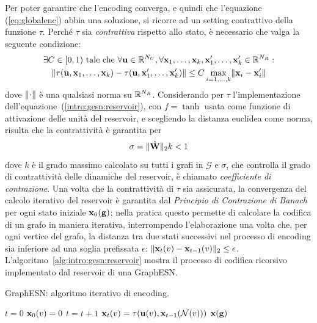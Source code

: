 Per poter garantire che l'encoding converga, e quindi che l'equazione (\ref{eq:globalenc}) abbia una soluzione, si ricorre ad un setting contrattivo della funzione $\tau$. Perché $\tau$ sia \emph{contrattiva} rispetto allo stato, è necessario che valga la seguente condizione:
\begin{multline}
\exists C \in [0,1) \mbox{ tale che } \forall \mathbf{u} \in \mathbb{R}^{N_U}, \forall \mathbf{x}_1, \dots , \mathbf{x}_k, \mathbf{x}'_1, \dots , \mathbf{x}'_k \in \mathbb{R}^{N_R} : \\
\lVert\tau(\mathbf{u}, \mathbf{x}_1, \dots , \mathbf{x}_k) - \tau(\mathbf{u}, \mathbf{x}'_1, \dots , \mathbf{x}'_k)\rVert \leq C \max_{i = 1, \dots ,k} \lVert\mathbf{x}_i - \mathbf{x}'_i\rVert
\end{multline}
dove $\lVert\cdot\rVert$ è una qualsiasi norma su $\mathbb{R}^{N_R}$. Considerando per $\tau$ l'implementazione dell'equazione~(\ref{intro:gesn:reservoir}), con $f=\tanh$ usata come funzione di attivazione delle unità del reservoir, e scegliendo la distanza euclidea come norma, risulta che la contrattività è garantita per \cite{Gallicchio:ExploitingVerticesStates}
\begin{equation}\label{eq:intro:gesn:sigma}
\sigma = \vectnorm{\hat{\matr{W}}}_2 k < 1
\end{equation}
dove $k$ è il grado massimo calcolato su tutti i grafi in $\mathcal{G}$ e $\sigma$, che controlla il grado di contrattività delle dinamiche del reservoir, è chiamato \emph{coefficiente di contrazione}. Una volta che la contrattività di $\tau$ sia assicurata, la convergenza del calcolo iterativo del reservoir è garantita dal \emph{Principio di Contrazione di Banach} \cite{Martelli:IntroductionToDiscrete} per ogni stato iniziale $\mathbf{x}_0(\mathbf{g})$; nella pratica questo permette di calcolare la codifica di un grafo in maniera iterativa, interrompendo l'elaborazione una volta che, per ogni vertice del grafo, la distanza tra due stati successivi nel processo di encoding sia inferiore ad una soglia prefissata $\epsilon$: $\lVert\mathbf{x}_t(v) - \mathbf{x}_{t-1}(v)\rVert_2 \leq \epsilon$. L'algoritmo~\vref{alg:intro:gesn:reservoir} mostra il processo di codifica ricorsivo implementato dal reservoir di una GraphESN.

\begin{algorithm}[tb]
\caption{GraphESN: algoritmo iterativo di encoding.}
\label{alg:intro:gesn:reservoir}
\begin{algorithmic}
	\STATE $t = 0$
		\STATE $\mathbf{x}_0(v) = 0$
	\ENDFOR
	\REPEAT
		\STATE $t = t+1$
			\STATE $\mathbf{x}_t(v) = \tau(\mathbf{u}(v), \mathbf{x}_{t-1}(\mathcal{N}(v)))$
		\ENDFOR
\ENDFOR
\RETURN $\mathbf{x}(\mathbf{g})$
\end{algorithmic}
\end{algorithm}

